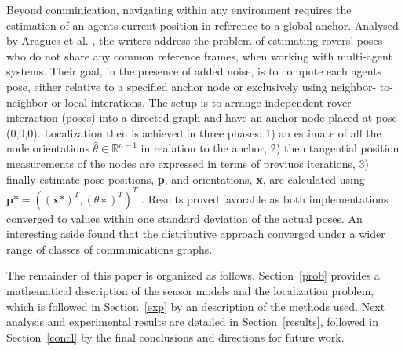 Beyond comminication, navigating within any environment requires the estimation of an agents current position in reference to a global anchor. Analysed by Aragues et al. \cite{aragues2011multi}, the writers address the problem of estimating rovers’ poses who do not share any common reference frames, when working with multi-agent systems. Their goal, in the presence of added noise, is to compute each agents pose, either relative to a specified anchor node or exclusively using neighbor- to-neighbor or local interations. The setup is to arrange independent rover interaction (poses) into a directed graph and have an anchor node placed at pose (0,0,0). Localization then is achieved in three phases: 1) an estimate of all the node orientations $\hat{\theta} \in \mathbb{R}^{n-1}$ in realation to the anchor, 2) then tangential position measurements of the nodes are expressed in terms of previuos iterations, 3) finally estimate pose positions, \textbf{p}, and orientations, \textbf{x}, are calculated using $\textbf{p*} = ((\textbf{x*})^T , (\theta∗)^T )^T$ . Results proved favorable as both implementations converged to values within one standard deviation of the actual poses. An interesting aside found that the distributive approach converged under a wider range of classes of communications graphs.

The remainder of this paper is organized as follows. Section~\ref{prob} provides a mathematical description of the sensor models and the localization problem, which is followed in Section~\ref{exp} by an description of the methods used. Next analysis and experimental results are detailed in Section~\ref{results}, followed in Section~\ref{concl} by the final conclusions and directions for future work.